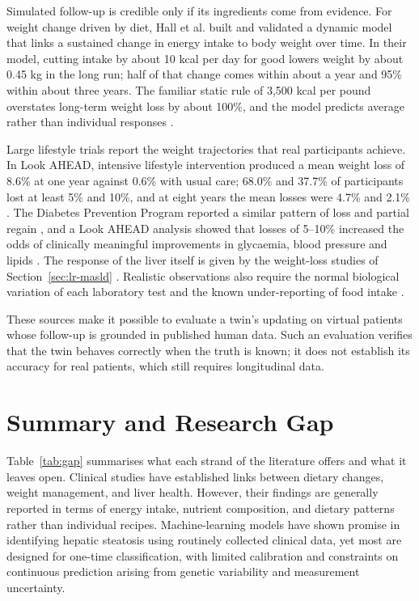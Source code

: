Simulated follow-up is credible only if its ingredients come from evidence. For weight change driven by diet, Hall et al. built and validated a dynamic model that links a sustained change in energy intake to body weight over time. In their model, cutting intake by about 10 kcal per day for good lowers weight by about 0.45 kg in the long run; half of that change comes within about a year and 95\% within about three years. The familiar static rule of 3,500 kcal per pound overstates long-term weight loss by about 100\%, and the model predicts average rather than individual responses \cite{hall2011energy}.

Large lifestyle trials report the weight trajectories that real participants achieve. In Look AHEAD, intensive lifestyle intervention produced a mean weight loss of 8.6\% at one year against 0.6\% with usual care; 68.0\% and 37.7\% of participants lost at least 5\% and 10\%, and at eight years the mean losses were 4.7\% and 2.1\% \cite{lookahead2014eightyear}. The Diabetes Prevention Program reported a similar pattern of loss and partial regain \cite{dpp2002}, and a Look AHEAD analysis showed that losses of 5--10\% increased the odds of clinically meaningful improvements in glycaemia, blood pressure and lipids \cite{wing2011modest}. The response of the liver itself is given by the weight-loss studies of Section~\ref{sec:lr-masld} \cite{koutoukidis2019weightloss,vilargomez2015weight,lim2011reversal}. Realistic observations also require the normal biological variation of each laboratory test \cite{eflm_bv} and the known under-reporting of food intake \cite{subar2003open}.

These sources make it possible to evaluate a twin's updating on virtual patients whose follow-up is grounded in published human data. Such an evaluation verifies that the twin behaves correctly when the truth is known; it does not establish its accuracy for real patients, which still requires longitudinal data.

\section{Summary and Research Gap}
\label{sec:lr-gap}

Table~\ref{tab:gap} summarises what each strand of the literature offers and what it leaves open. Clinical studies have established links between dietary changes, weight management, and liver health. However, their findings are generally reported in terms of energy intake, nutrient composition, and dietary patterns rather than individual recipes. Machine-learning models have shown promise in identifying hepatic steatosis using routinely collected clinical data, yet most are designed for one-time classification, with limited calibration and constraints on continuous prediction arising from genetic variability and measurement uncertainty.

